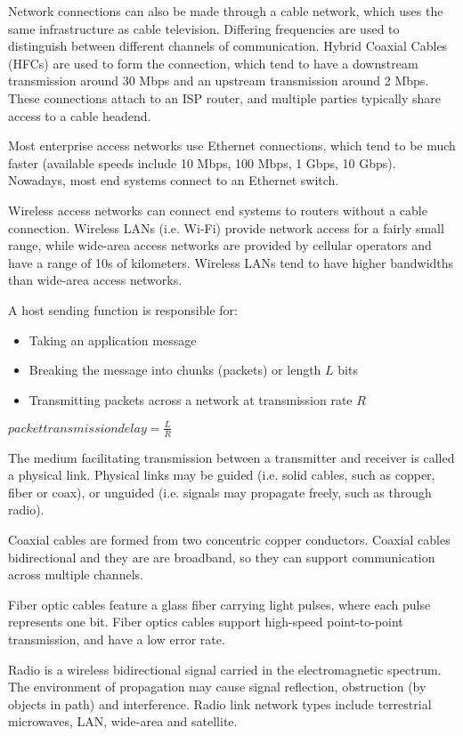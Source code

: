 \documentclass[12pt,titlepage]{article}
\begin{document}
      Network connections can also be made through a cable network, which uses the same infrastructure as cable television.
      Differing frequencies are used to distinguish between different channels of communication. Hybrid Coaxial Cables (HFCs) are
      used to form the connection, which tend to have a downstream transmission around 30 Mbps and an upstream transmission around
      2 Mbps. These connections attach to an ISP router, and multiple parties typically share access to a cable headend.

      Most enterprise access networks use Ethernet connections, which tend to be much faster (available speeds include 10 Mbps, 100 Mbps,
      1 Gbps, 10 Gbps). Nowadays, most end systems connect to an Ethernet switch.

      Wireless access networks can connect end systems to routers without a cable connection. Wireless LANs (i.e. Wi-Fi) provide network
      access for a fairly small range, while wide-area access networks are provided by cellular operators and have a range of 10s of
      kilometers. Wireless LANs tend to have higher bandwidths than wide-area access networks.

      A host sending function is responsible for:
        \begin{itemize}
          \item Taking an application message
          \item Breaking the message into chunks (packets) or length $L$ bits
          \item Transmitting packets across a network at transmission rate $R$
        \end{itemize}
      $packet transmission delay = \frac{L}{R}$

      The medium facilitating transmission between a transmitter and receiver is called a physical link. Physical links may be guided
      (i.e. solid cables, such as copper, fiber or coax), or unguided (i.e. signals may propagate freely, such as through radio).

      Coaxial cables are formed from two concentric copper conductors. Coaxial cables bidirectional and they are are broadband, so they
      can support communication across multiple channels.

      Fiber optic cables feature a glass fiber carrying light pulses, where each pulse represents one bit. Fiber optics cables support
      high-speed point-to-point transmission, and have a low error rate.

      Radio is a wireless bidirectional signal carried in the electromagnetic spectrum. The environment of propagation may cause signal
      reflection, obstruction (by objects in path) and interference. Radio link network types include terrestrial microwaves, LAN, wide-area
      and satellite.
\end{document}
